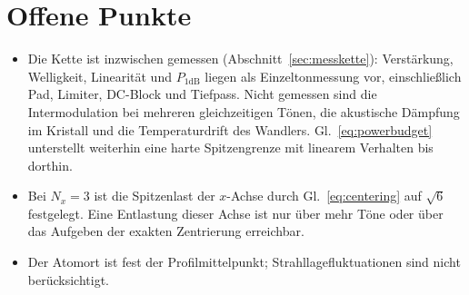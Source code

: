\documentclass[11pt,a4paper]{article}
\begin{document}
\section*{Offene Punkte}

\begin{itemize}\itemsep0.2em
  \item Die Kette ist inzwischen gemessen
        (Abschnitt~\ref{sec:messkette}): Verstärkung, Welligkeit, Linearität
        und $P_{1\mathrm{dB}}$ liegen als Einzeltonmessung vor, einschließlich
        Pad, Limiter, DC-Block und Tiefpass. Nicht gemessen sind die
        Intermodulation bei mehreren gleichzeitigen Tönen, die akustische
        Dämpfung im Kristall und die Temperaturdrift des Wandlers.
        Gl.~\eqref{eq:powerbudget} unterstellt weiterhin eine harte
        Spitzengrenze mit linearem Verhalten bis dorthin.
  \item Bei $N_x=3$ ist die Spitzenlast der $x$-Achse durch
        Gl.~\eqref{eq:centering} auf $\sqrt{6}$ festgelegt. Eine Entlastung
        dieser Achse ist nur über mehr Töne oder über das Aufgeben der
        exakten Zentrierung erreichbar.
  \item Der Atomort ist fest der Profilmittelpunkt; Strahllagefluktuationen
        sind nicht berücksichtigt.
\end{itemize}
\end{document}
